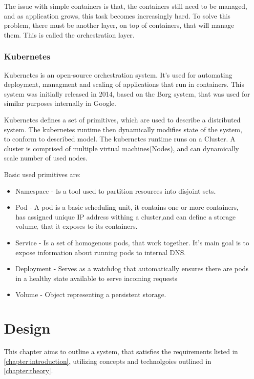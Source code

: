 The issue with simple containers is that, the containers still need to be managed, and as application
grows, this task becomes increasingly hard. To solve this problem, there must be another layer, on top of containers,
that will manage them. This is called the orchestration layer.

\subsection{Kubernetes}

Kubernetes\cite{web:k8s} is an open-source orchestration system. It's used for automating
deployment, managment and scaling of applications that run in containers. This system was initially released in 2014,
based on the Borg\cite{borg} system, that was used for similar purposes internally in Google.

Kubernetes defines a set of primitives, which are used to describe a distributed system. The kubernetes
runtime then dynamically modifies state of the system, to conform to described model. The kubernetes runtime
runs on a Cluster. A cluster is comprised of multiple virtual machines(Nodes), and can dynamically scale number
of used nodes.

Basic used primitives are:
\begin{itemize}
    \item Namespace - Is a tool used to partition resources into disjoint sets.
    \item Pod - A pod is a basic scheduling unit, it contains one or more containers, has assigned unique IP address
    withing a cluster,and can define a storage volume, that it exposes to its containers.
    \item Service - Is a set of homogenous pods, that work together. It's main goal is to expose information about running
    pods to internal DNS.
    \item Deployment - Serves as a watchdog that automatically ensures there are pods in a healthy state available to
    serve incoming requests
    \item Volume - Object representing a persistent storage.
\end{itemize}


\chapter{Design}
\label{chapter:design}

This chapter aims to outline a system, that satisfies the requirements listed in \autoref{chapter:introduction}, utilizing
concepts and technolgoies outlined in \autoref{chapter:theory}.


